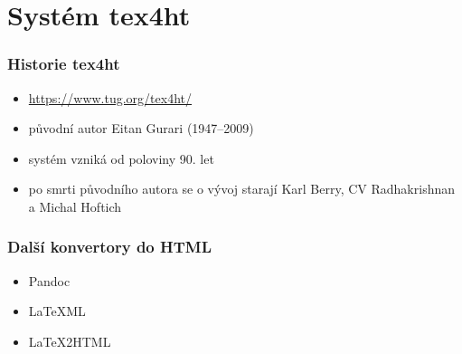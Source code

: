 \documentclass[czech]{beamer}
\begin{document}
  \section{Systém tex4ht}
\begin{frame}
  \frametitle{Historie tex4ht}
  \begin{itemize}
    \item \url{https://www.tug.org/tex4ht/}
    \item původní autor Eitan Gurari (1947--2009)
    \item systém vzniká od poloviny 90. let
    \item po smrti původního autora se o vývoj starají Karl Berry, CV Radhakrishnan a Michal Hoftich
  \end{itemize}
\end{frame}

\begin{frame}
  \frametitle{Další konvertory do HTML}
  \begin{itemize}
    \item Pandoc
    \item LaTeXML
    \item LaTeX2HTML
  \end{itemize}
\end{frame}
\end{document}
